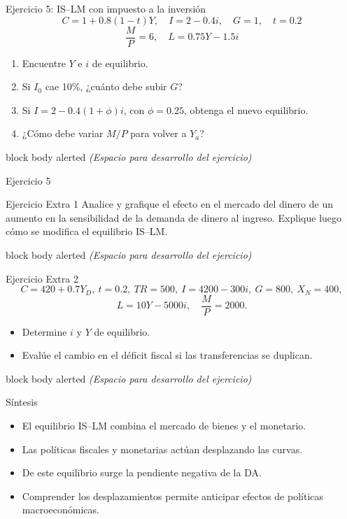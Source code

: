 \documentclass[aspectratio=169]{beamer}
\newcommand{\espaciodesarrollo}{
\vspace{0.6cm}
\begin{beamercolorbox}[wd=\textwidth,rounded=true,shadow=false,sep=8pt,center]{block body alerted}
\vspace{1.8cm}
\textit{(Espacio para desarrollo del ejercicio)}
\vspace{1.8cm}
\end{beamercolorbox}
}
\begin{document}
\begin{frame}{Ejercicio 5: IS–LM con impuesto a la inversión}
\[
C = 1 + 0.8(1 - t)Y, \quad I = 2 - 0.4i, \quad G = 1, \quad t = 0.2
\]
\[
\frac{M}{P}=6, \quad L = 0.75Y - 1.5i
\]
\begin{enumerate}[label=\alph*)]
\item Encuentre \(Y\) e \(i\) de equilibrio.  
\item Si \(I_0\) cae 10\%, ¿cuánto debe subir \(G\)?  
\item Si \(I = 2 - 0.4(1+\phi)i\), con \(\phi=0.25\), obtenga el nuevo equilibrio.  
\item ¿Cómo debe variar \(M/P\) para volver a \(Y_a\)?  
\end{enumerate}
\espaciodesarrollo
\end{frame}

\begin{frame}{Ejercicio 5}
    
\end{frame}

\begin{frame}{Ejercicio Extra 1}
Analice y grafique el efecto en el mercado del dinero de un aumento en la sensibilidad de la demanda de dinero al ingreso.  
Explique luego cómo se modifica el equilibrio IS–LM.
\espaciodesarrollo
\end{frame}

\begin{frame}{Ejercicio Extra 2}
\[
C = 420 + 0.7Y_D,\ t = 0.2,\ TR = 500,\ I = 4200 - 300i,\ G = 800,\ X_N = 400,
\]
\[
L = 10Y - 5000i,\quad \frac{M}{P} = 2000.
\]
\begin{itemize}
  \item Determine \(i\) y \(Y\) de equilibrio.  
  \item Evalúe el cambio en el déficit fiscal si las transferencias se duplican.  
\end{itemize}
\espaciodesarrollo
\end{frame}

\begin{frame}{Síntesis}
\begin{itemize}
  \item El equilibrio IS–LM combina el mercado de bienes y el monetario.
  \item Las políticas fiscales y monetarias actúan desplazando las curvas.
  \item De este equilibrio surge la pendiente negativa de la DA.
  \item Comprender los desplazamientos permite anticipar efectos de políticas macroeconómicas.
\end{itemize}
\end{frame}
\end{document}
